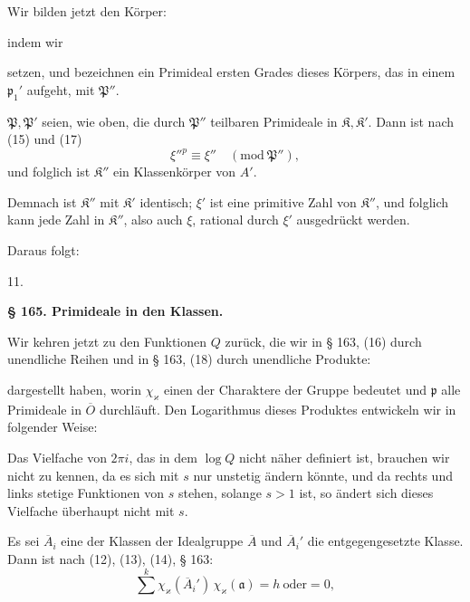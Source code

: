 Wir bilden jetzt den Körper:


indem wir


setzen, und bezeichnen ein Primideal ersten Grades dieses Körpers,
das in einem $\mathfrak{p}_1'$ aufgeht, mit $\mathfrak{P}''$.

$\mathfrak{P}, \mathfrak{P}'$ seien, wie oben, die durch $\mathfrak{P}''$ teilbaren Primideale in
$\mathfrak{K}, \mathfrak{K}'$. Dann ist nach (15) und (17)
\[
\xi''^{p} \equiv \xi'' \quad (\mathrm{mod}\ \mathfrak{P}''),
\]
und folglich ist $\mathfrak{K}''$ ein Klassenkörper von $A'$.

Demnach ist $\mathfrak{K}''$ mit $\mathfrak{K}'$ identisch; $\xi'$ ist eine primitive Zahl
von $\mathfrak{K}''$, und folglich kann jede Zahl in $\mathfrak{K}''$, also auch $\xi$, rational
durch $\xi'$ ausgedrückt werden.

Daraus folgt:

11. 

\begin{center}
\textbf{§ 165. Primideale in den Klassen.}
\end{center}

Wir kehren jetzt zu den Funktionen $Q$ zurück, die wir in
§ 163, (16) durch unendliche Reihen und in § 163, (18) durch
unendliche Produkte:


dargestellt haben, worin $\chi_{\varkappa}$ einen der Charaktere der Gruppe
bedeutet und $\mathfrak{p}$ alle Primideale in $\overline{O}$ durchläuft. Den Logarithmus
 dieses Produktes entwickeln wir in folgender Weise:


Das Vielfache von $2\pi i$, das in dem $\log Q$ nicht näher definiert
ist, brauchen wir nicht zu kennen, da es sich mit $s$ nur unstetig
ändern könnte, und da rechts und links stetige Funktionen von
$s$ stehen, solange $s > 1$ ist, so ändert sich dieses Vielfache überhaupt
 nicht mit $s$.

Es sei $\overline{A}_i$ eine der Klassen der Idealgruppe $\overline{A}$ und $\overline{A}_i'$ die
entgegengesetzte Klasse. Dann ist nach (12), (13), (14), § 163:
\[
\overset{k}{\sum} \chi_{\varkappa}(\overline{A}_i')\,\chi_{\varkappa}(\mathfrak{a}) = h \ \text{oder} = 0,
\]
